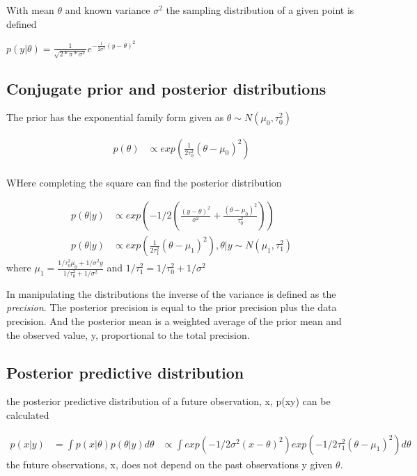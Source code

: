 \documentclass[
]{book}
\theoremstyle{definition}
\theoremstyle{definition}
\theoremstyle{definition}
\theoremstyle{definition}
\theoremstyle{remark}
\begin{document}
With mean \(\theta\) and known variance \(\sigma^2\) the sampling distribution of a given point is defined

\(p(y|\theta) = \frac{1}{\sqrt{2*\pi*\sigma^2}}e^{-\frac{1}{2\sigma^2} (y-\theta)^2}\)

\hypertarget{conjugate-prior-and-posterior-distributions}{%
\subsection{Conjugate prior and posterior distributions}\label{conjugate-prior-and-posterior-distributions}}

The prior has the exponential family form given as \(\theta \sim N(\mu_0, \tau_0^2)\)

\[
\begin{aligned}
 p(\theta ) &\propto exp( \frac{1}{2\tau_0^2}(\theta-\mu_0)^2) \\
 \end{aligned}
\]

WHere completing the square can find the posterior distribution

\[
\begin{aligned}
 p(\theta | y ) &\propto exp(-1/2(\frac{(y-\theta)^2}{\sigma^2} +\frac{(\theta-\mu_0)^2}{\tau_0^2} )  ) \\
 p(\theta | y ) &\propto exp( \frac{1}{2\tau_1^2}(\theta-\mu_1)^2),  \theta|y \sim N(\mu_1,\tau_1^2)
 \end{aligned}
\]
where \(\mu_1 = \frac{1/\tau_0^2 \mu_0 + 1/\sigma^2 y}{1/\tau_0^2 + 1/\sigma^2}\) and \(1/\tau_1^2 = 1/\tau_0^2 +1/\sigma^2\)

In manipulating the distributions the inverse of the variance is defined as the \emph{precision}. The posterior precision is equal to the prior precision plus the data precision. And the posterior mean is a weighted average of the prior mean and the observed value, y, proportional to the total precision.

\hypertarget{posterior-predictive-distribution}{%
\subsection*{Posterior predictive distribution}\label{posterior-predictive-distribution}}

the posterior predictive distribution of a future observation, x, p(x\textbar y) can be calculated

\[
\begin{aligned}
p(x|y) &= \int p(x|\theta)p(\theta|y) d\theta
&\propto \int exp(-1/2\sigma^2 (x-\theta)^2) exp(-1/2\tau_1^2 (\theta-\mu_1)^2) d\theta
\end{aligned}
\]
the future observations, x, does not depend on the past observations y given \(\theta\).
\end{document}
